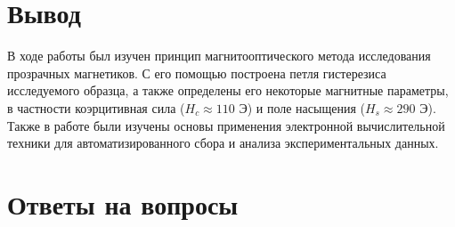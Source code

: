 \documentclass[a4paper]{article}
\begin{document}
\section{Вывод}

В ходе работы был изучен принцип магнитооптического метода исследования прозрачных магнетиков. С его помощью построена петля гистерезиса исследуемого образца, а также определены его некоторые магнитные параметры, в частности коэрцитивная сила ($H_c \approx 110$ Э) и поле насыщения ($H_s \approx 290$ Э). Также в работе были изучены основы применения электронной вычислительной техники для автоматизированного сбора и анализа экспериментальных данных.


\section{Ответы на вопросы}
\end{document}
